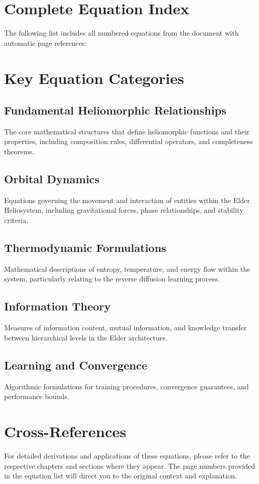 \section{Complete Equation Index}

The following list includes all numbered equations from the document with automatic page references:

\listofequations

\section{Key Equation Categories}

\subsection{Fundamental Heliomorphic Relationships}
The core mathematical structures that define heliomorphic functions and their properties, including composition rules, differential operators, and completeness theorems.

\subsection{Orbital Dynamics}
Equations governing the movement and interaction of entities within the Elder Heliosystem, including gravitational forces, phase relationships, and stability criteria.

\subsection{Thermodynamic Formulations}
Mathematical descriptions of entropy, temperature, and energy flow within the system, particularly relating to the reverse diffusion learning process.

\subsection{Information Theory}
Measures of information content, mutual information, and knowledge transfer between hierarchical levels in the Elder architecture.

\subsection{Learning and Convergence}
Algorithmic formulations for training procedures, convergence guarantees, and performance bounds.

\section{Cross-References}

For detailed derivations and applications of these equations, please refer to the respective chapters and sections where they appear. The page numbers provided in the equation list will direct you to the original context and explanation.